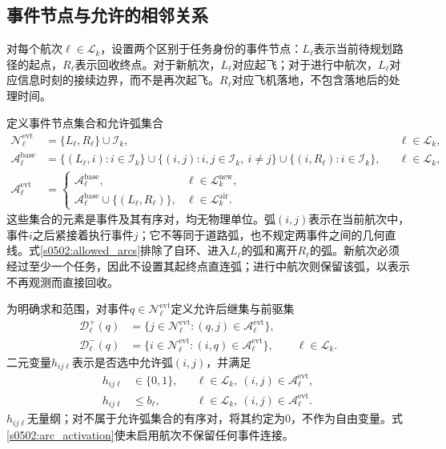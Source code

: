 \subsection{事件节点与允许的相邻关系}

对每个航次$\ell\in\mathcal L_k$，设置两个区别于任务身份的事件节点：$L_\ell$表示当前待规划路径的起点，$R_\ell$表示回收终点。对于新航次，$L_\ell$对应起飞；对于进行中航次，$L_\ell$对应信息时刻的接续边界，而不是再次起飞。$R_\ell$对应飞机落地，不包含落地后的处理时间。

定义事件节点集合和允许弧集合
\begin{align}
 \mathcal N_\ell^{\mathrm{evt}}
 &=\{L_\ell,R_\ell\}\cup\mathcal I_k,
 &&\ell\in\mathcal L_k,
 \label{s0502:event_nodes}\\
 \mathcal A_\ell^{\mathrm{base}}
 &=\{(L_\ell,i):i\in\mathcal I_k\}
 \cup\{(i,j):i,j\in\mathcal I_k,\ i\ne j\}
 \cup\{(i,R_\ell):i\in\mathcal I_k\},
 &&\ell\in\mathcal L_k,
 \label{s0502:base_arcs}\\
 \mathcal A_\ell^{\mathrm{evt}}
 &=\begin{cases}
 \mathcal A_\ell^{\mathrm{base}},
 &\ell\in\mathcal L_k^{\mathrm{new}},\\
 \mathcal A_\ell^{\mathrm{base}}\cup\{(L_\ell,R_\ell)\},
 &\ell\in\mathcal L_k^{\mathrm{air}}.
 \end{cases}
 \label{s0502:allowed_arcs}
\end{align}
这些集合的元素是事件及其有序对，均无物理单位。弧$(i,j)$表示在当前航次中，事件$i$之后紧接着执行事件$j$；它不等同于道路弧，也不规定两事件之间的几何直线。式\eqref{s0502:allowed_arcs}排除了自环、进入$L_\ell$的弧和离开$R_\ell$的弧。新航次必须经过至少一个任务，因此不设置其起终点直连弧；进行中航次则保留该弧，以表示不再观测而直接回收。

为明确求和范围，对事件$q\in\mathcal N_\ell^{\mathrm{evt}}$定义允许后继集与前驱集
\begin{equation}
 \begin{split}
 \mathcal D_\ell^+(q)
 &=\{j\in\mathcal N_\ell^{\mathrm{evt}}:(q,j)\in\mathcal A_\ell^{\mathrm{evt}}\},\\
 \mathcal D_\ell^-(q)
 &=\{i\in\mathcal N_\ell^{\mathrm{evt}}:(i,q)\in\mathcal A_\ell^{\mathrm{evt}}\},
 \qquad \ell\in\mathcal L_k.
 \end{split}
 \label{s0502:event_neighbors}
\end{equation}
二元变量$h_{ij\ell}$表示是否选中允许弧$(i,j)$，并满足
\begin{align}
 h_{ij\ell}&\in\{0,1\},
 &&\ell\in\mathcal L_k,\ (i,j)\in\mathcal A_\ell^{\mathrm{evt}},
 \label{s0502:arc_domain}\\
 h_{ij\ell}&\le b_\ell,
 &&\ell\in\mathcal L_k,\ (i,j)\in\mathcal A_\ell^{\mathrm{evt}}.
 \label{s0502:arc_activation}
\end{align}
$h_{ij\ell}$无量纲；对不属于允许弧集合的有序对，将其约定为$0$，不作为自由变量。式\eqref{s0502:arc_activation}使未启用航次不保留任何事件连接。

